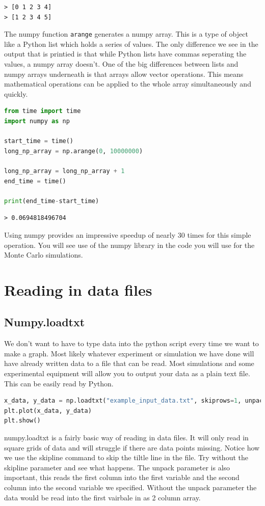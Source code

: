 	\begin{verbatim}
> [0 1 2 3 4]
> [1 2 3 4 5]
	\end{verbatim}

	The numpy function \texttt{arange} generates a numpy array. This is a type of object like a Python list which holds a series of values. The only difference we see in the output that is printied is that while Python lists have commas seperating the values, a numpy array doesn't. One of the big differences between lists and numpy arrays underneath is that arrays allow vector operations. This means mathematical operations can be applied to the whole array simultaneously and quickly.

	\begin{lstlisting}[language=Python]
from time import time
import numpy as np

start_time = time()
long_np_array = np.arange(0, 10000000)

long_np_array = long_np_array + 1
end_time = time()

print(end_time-start_time)\end{lstlisting}
	\begin{verbatim}
> 0.0694818496704 \end{verbatim}

	Using numpy provides an impressive speedup of nearly 30 times for this simple operation. You will see use of the numpy library in the code you will use for the Monte Carlo simulations.

\section{Reading in data files}
	\subsection{Numpy.loadtxt}
		We don't want to have to type data into the python script every time we want to make a graph. Most likely whatever experiment or simulation we have done will have already written data to a file that can be read. Most simulations and some experimental equipment will allow you to output your data as a plain text file. This can be easily read by Python.
		\begin{lstlisting}[language=Python]
x_data, y_data = np.loadtxt("example_input_data.txt", skiprows=1, unpack=True)
plt.plot(x_data, y_data)
plt.show()\end{lstlisting}

numpy.loadtxt is a fairly basic way of reading in data files. It will only read in square grids of data and will struggle if there are data points missing. Notice how we use the skipline command to skip the tiltle line in the file. Try without the skipline parameter and see what happens. The unpack parameter is also important, this reads the first column into the first variable and the second column into the second variable we specified. Without the unpack parameter the data would be read into the first vairbale in as 2 column array.

